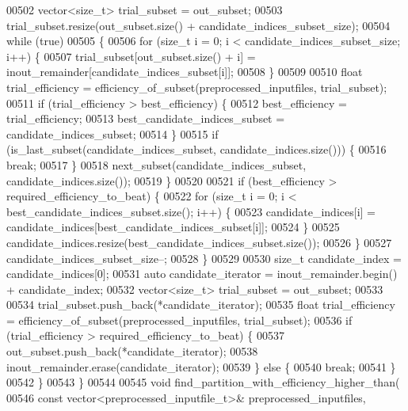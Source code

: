 \begin{DoxyCode}
{{00502       vector<size\_t> trial\_subset = out\_subset;
00503       trial\_subset.resize(out\_subset.size() + candidate\_indices\_subset\_size);
00504       \textcolor{keywordflow}{while} (\textcolor{keyword}{true})
00505       \{
00506         \textcolor{keywordflow}{for} (\textcolor{keywordtype}{size\_t} i = 0; i < candidate\_indices\_subset\_size; i++) \{
00507           trial\_subset[out\_subset.size() + i] = inout\_remainder[candidate\_indices\_subset[i]];
00508         \}
00509         
00510         \textcolor{keywordtype}{float} trial\_efficiency = efficiency\_of\_subset(preprocessed\_inputfiles, trial\_subset);
00511         \textcolor{keywordflow}{if} (trial\_efficiency > best\_efficiency) \{
00512           best\_efficiency = trial\_efficiency;
00513           best\_candidate\_indices\_subset = candidate\_indices\_subset;
00514         \}
00515         \textcolor{keywordflow}{if} (is\_last\_subset(candidate\_indices\_subset, candidate\_indices.size())) \{
00516           \textcolor{keywordflow}{break};
00517         \}
00518         next\_subset(candidate\_indices\_subset, candidate\_indices.size());
00519       \}
00520        
00521       \textcolor{keywordflow}{if} (best\_efficiency > required\_efficiency\_to\_beat) \{
00522         \textcolor{keywordflow}{for} (\textcolor{keywordtype}{size\_t} i = 0; i < best\_candidate\_indices\_subset.size(); i++) \{
00523           candidate\_indices[i] = candidate\_indices[best\_candidate\_indices\_subset[i]];
00524         \}
00525         candidate\_indices.resize(best\_candidate\_indices\_subset.size());
00526       \}
00527       candidate\_indices\_subset\_size--;
00528     \}
00529       
00530     \textcolor{keywordtype}{size\_t} candidate\_index = candidate\_indices[0];
00531     \textcolor{keyword}{auto} candidate\_iterator = inout\_remainder.begin() + candidate\_index;
00532     vector<size\_t> trial\_subset = out\_subset;
00533 
00534     trial\_subset.push\_back(*candidate\_iterator);
00535     \textcolor{keywordtype}{float} trial\_efficiency = efficiency\_of\_subset(preprocessed\_inputfiles, trial\_subset);
00536     \textcolor{keywordflow}{if} (trial\_efficiency > required\_efficiency\_to\_beat) \{
00537       out\_subset.push\_back(*candidate\_iterator);
00538       inout\_remainder.erase(candidate\_iterator);
00539     \} \textcolor{keywordflow}{else} \{
00540       \textcolor{keywordflow}{break};
00541     \}
00542   \}
00543 \}
00544 
00545 \textcolor{keywordtype}{void} find\_partition\_with\_efficiency\_higher\_than(
00546        \textcolor{keyword}{const} vector<preprocessed\_inputfile\_t>& preprocessed\_inputfiles,
}}
\end{DoxyCode}
